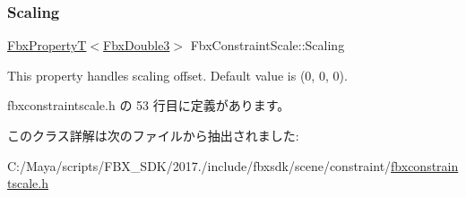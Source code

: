 \mbox{\label{class_fbx_constraint_scale_a0c8bd160ee16da64bf998a612bb11a5b}} 
\subsubsection{\texorpdfstring{Scaling}{Scaling}}
{\footnotesize\ttfamily \hyperlink{class_fbx_property_t}{Fbx\+PropertyT}$<$\hyperlink{fbxtypes_8h_ae0a96f14cde566774c7553aa7523b7a7}{Fbx\+Double3}$>$ Fbx\+Constraint\+Scale\+::\+Scaling}

This property handles scaling offset. Default value is (0, 0, 0). 

 fbxconstraintscale.\+h の 53 行目に定義があります。



このクラス詳解は次のファイルから抽出されました\+:\begin{DoxyCompactItemize}
\item 
C\+:/\+Maya/scripts/\+F\+B\+X\+\_\+\+S\+D\+K/2017./include/fbxsdk/scene/constraint/\hyperlink{fbxconstraintscale_8h}{fbxconstraintscale.\+h}\end{DoxyCompactItemize}
